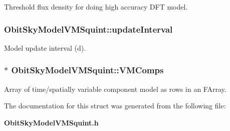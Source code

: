 Threshold flux density for doing high accuracy DFT model. 

\subsubsection{ {\bf Obit\-Sky\-Model\-VMSquint::update\-Interval}}\label{structObitSkyModelVMSquint_o60}


Model update interval (d). 

\subsubsection{$\ast$ {\bf Obit\-Sky\-Model\-VMSquint::VMComps}}\label{structObitSkyModelVMSquint_o57}


Array of time/spatially variable component model as rows in an FArray. 



The documentation for this struct was generated from the following file:\begin{CompactItemize}
\item 
{\bf Obit\-Sky\-Model\-VMSquint.h}\end{CompactItemize}
